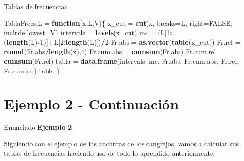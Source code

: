 \documentclass[
  ignorenonframetext,
]{beamer}
\newenvironment{Shaded}{\begin{snugshade}}{\end{snugshade}}
\newcommand{\AttributeTok}[1]{\textcolor[rgb]{0.13,0.29,0.53}{#1}}
\newcommand{\ConstantTok}[1]{\textcolor[rgb]{0.56,0.35,0.01}{#1}}
\newcommand{\ControlFlowTok}[1]{\textcolor[rgb]{0.13,0.29,0.53}{\textbf{#1}}}
\newcommand{\DecValTok}[1]{\textcolor[rgb]{0.00,0.00,0.81}{#1}}
\newcommand{\FunctionTok}[1]{\textcolor[rgb]{0.13,0.29,0.53}{\textbf{#1}}}
\newcommand{\NormalTok}[1]{#1}
\newcommand{\OtherTok}[1]{\textcolor[rgb]{0.56,0.35,0.01}{#1}}
\newcommand{\SpecialCharTok}[1]{\textcolor[rgb]{0.81,0.36,0.00}{\textbf{#1}}}
\begin{document}
\begin{frame}[fragile]{Tablas de frecuencias}
\label{tablas-de-frecuencias}
\begin{Shaded}
\begin{Highlighting}[]
\NormalTok{TablaFrecs.L }\OtherTok{=} \ControlFlowTok{function}\NormalTok{(x,L,V)\{}
\NormalTok{  x\_cut }\OtherTok{=} \FunctionTok{cut}\NormalTok{(x, }\AttributeTok{breaks=}\NormalTok{L, }\AttributeTok{right=}\ConstantTok{FALSE}\NormalTok{, }\AttributeTok{include.lowest=}\NormalTok{V)}
\NormalTok{  intervals }\OtherTok{=} \FunctionTok{levels}\NormalTok{(x\_cut)}
\NormalTok{  mc }\OtherTok{=}\NormalTok{ (L[}\DecValTok{1}\SpecialCharTok{:}\NormalTok{(}\FunctionTok{length}\NormalTok{(L)}\SpecialCharTok{{-}}\DecValTok{1}\NormalTok{)]}\SpecialCharTok{+}\NormalTok{L[}\DecValTok{2}\SpecialCharTok{:}\FunctionTok{length}\NormalTok{(L)])}\SpecialCharTok{/}\DecValTok{2}
\NormalTok{  Fr.abs }\OtherTok{=} \FunctionTok{as.vector}\NormalTok{(}\FunctionTok{table}\NormalTok{(x\_cut)) }
\NormalTok{  Fr.rel }\OtherTok{=} \FunctionTok{round}\NormalTok{(Fr.abs}\SpecialCharTok{/}\FunctionTok{length}\NormalTok{(x),}\DecValTok{4}\NormalTok{)}
\NormalTok{  Fr.cum.abs }\OtherTok{=} \FunctionTok{cumsum}\NormalTok{(Fr.abs)}
\NormalTok{  Fr.cum.rel }\OtherTok{=} \FunctionTok{cumsum}\NormalTok{(Fr.rel)}
\NormalTok{  tabla }\OtherTok{=} \FunctionTok{data.frame}\NormalTok{(intervals, mc, Fr.abs, Fr.cum.abs, Fr.rel, Fr.cum.rel)}
\NormalTok{  tabla}
\NormalTok{  \}}
\end{Highlighting}
\end{Shaded}
\end{frame}

\section{Ejemplo 2 - Continuación}\label{ejemplo-2---continuaciuxf3n}

\begin{frame}{Enunciado}
\label{enunciado-1}
\textbf{Ejemplo 2}

Siguiendo con el ejemplo de las anchuras de los cangrejos, vamos a
calcular sus tablas de frecuencias haciendo uso de todo lo aprendido
anteriormente.
\end{frame}
\end{document}
